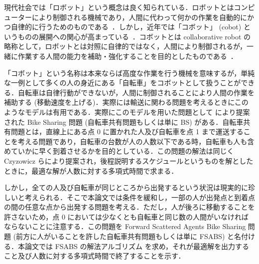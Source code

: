 現代社会では「ロボット」という概念は良く知られている．ロボットとはコンピューターにより制御される機械であり，人間に代わって何かの作業を自動的にかつ自律的に行うためのものである~\cite{dict:cambridge:robot,dict:mw:robot,dict:daijirin:robot}．しかし，近年では「コボット」 (cobot) というものの展開への関心が高まっている~\cite{4154820,6386300}．コボットとは collaborative robot の略称として，ロボットとは対照に自律的ではなく，人間により制御されるが，一緒に作業する人間の能力を補助・強化することを目的としたものである~\cite{patent:cobots}．

「コボット」という名称は本来ならば高度な作業を行う機械を意味するが，単純な一例として多くの人の身近にある「自転車」をコボットとして扱うことができる．自転車は自律行動ができないが，人間に制御されることにより人間の作業を補助する (移動速度を上げる)．実際には輸送に関わる問題を考えるときにこのようなモデルは有用である．実際にこのモデルを用いた問題として \textcite{czyzowicz} により提案された Bike Sharing 問題 (自転車共有問題もしくは単に BS) がある．自転車共有問題とは，直線上にある点 0 に置かれた人及び自転車を点 1 まで運送することを考える問題であり，自転車の台数が人の人数以下である時，自転車も人も含めていかに早く到着させるかを目的としている．この問題の解法は同じく Czyzowicz らにより提案され，後程説明するスケジュールというものを解としたときに，最適な解が人数に対する多項式時間で求まる．

しかし，全ての人及び自転車が同じところから出発するという状況は現実的に珍しいと考えられる．そこで本論文では条件を緩和し，一部の人が出発点と到着点の間の任意な点から出発する問題を考える．ただし，人が後ろに移動することを許さないため，点 0 においては少なくとも自転車と同じ数の人間がいなければならないことに注意する．この問題を Forward Scattered Agents Bike Sharing 問題 (前方に人がいることを許した自転車共有問題もしくは単に FSABS) と名付ける．本論文では FSABS の解法アルゴリズム \SolveFSABS{} を求め，それが最適解を出力すること及び人数に対する多項式時間で終了することを示す．